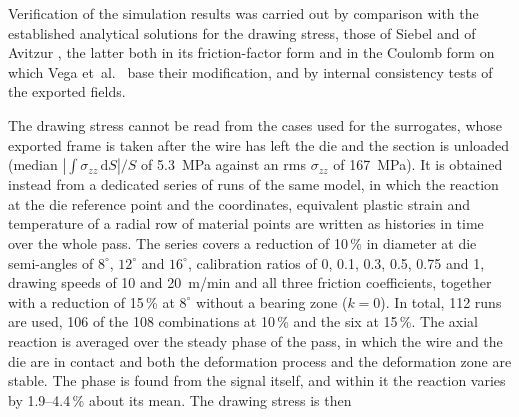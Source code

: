 Verification of the simulation results was carried out by comparison with the established
analytical solutions for the drawing stress, those of Siebel
\citep{siebel1943erwaermung,siebel1947drahtziehen} and of Avitzur
\citep{avitzur1963small,avitzur1964large}, the latter both in its friction-factor form and in the
Coulomb form on which Vega et~al.\ \citep{vega2009temperature} base their modification, and by
internal consistency tests of the exported fields.

The drawing stress cannot be read from the cases used for the surrogates, whose exported frame is
taken after the wire has left the die and the section is unloaded (median
$|\int\sigma_{zz}\,\mathrm{d}S|/S$ of 5.3~MPa against an rms $\sigma_{zz}$ of 167~MPa).
It is obtained instead from a dedicated series of runs of the same model, in which the reaction at
the die reference point and the coordinates, equivalent plastic strain and temperature of a
radial row of material points are written as histories in time over the whole pass. The series
covers a reduction of 10\,\% in diameter at die semi-angles of $8^\circ$, $12^\circ$ and
$16^\circ$, calibration ratios of 0, 0.1, 0.3, 0.5, 0.75 and 1, drawing speeds of 10 and 20~m/min and all three friction
coefficients, together with a reduction of 15\,\% at $8^\circ$ without a bearing zone ($k = 0$). In total, 112 runs are
used, 106 of the 108 combinations at 10\,\% and the six at 15\,\%.
The axial reaction is averaged over the steady phase of the pass, in which the wire and the die
are in contact and both the deformation process and the deformation zone are stable. The phase
is found from the signal itself, and within it the reaction varies by 1.9--4.4\,\% about its
mean. The drawing stress is then
